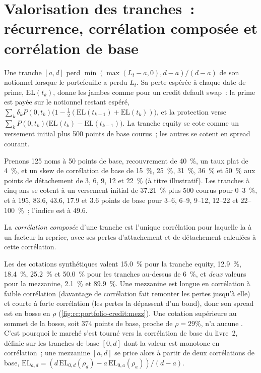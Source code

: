 \section{Valorisation des tranches~: récurrence, corrélation composée et corrélation de base}

Une tranche $[a,d]$ perd $\min(\max(L_t-a,0),d-a)/(d-a)$ de son notionnel lorsque le portefeuille
a perdu $L_t$. Sa perte espérée à chaque date de prime, $\mathrm{EL}(t_k)$, donne les jambes comme pour
un credit default swap~: la prime est payée sur le notionnel restant espéré,
$\sum_k\delta_kP(0,t_k)\bigl(1-\tfrac12(\mathrm{EL}(t_{k-1})+\mathrm{EL}(t_k))\bigr)$, et la protection
verse $\sum_kP(0,t_k)\bigl(\mathrm{EL}(t_k)-\mathrm{EL}(t_{k-1})\bigr)$. La tranche equity se cote comme un
versement initial plus 500 points de base courus~; les autres se cotent en spread courant.

\begin{example}\label{ex:rc:portfolio-credit:quotes}
Prenons 125 noms à 50 points de base, recouvrement de 40~\%, un taux plat de 4~\%, et un skew de
corrélation de base de 15~\%, 25~\%, 31~\%, 36~\% et 50~\% aux points de détachement de 3, 6, 9, 12 et 22~\% (à titre illustratif).
Les tranches à cinq ans se cotent à un versement initial de 37.21~\% plus 500 courus pour 0--3~\%, et
à 195, 83.6, 43.6, 17.9 et 3.6 points de base pour 3--6, 6--9, 9--12, 12--22 et 22--100~\%~;
l'indice est à 49.6.
\end{example}

\begin{definition}\label{def:rc:portfolio-credit:compound}
La \emph{corrélation composée} d'une tranche est l'unique
corrélation pour laquelle la  à un facteur la reprice, avec ses pertes
d'attachement et de détachement calculées à cette corrélation.
\end{definition}

Les  des cotations synthétiques valent 15.0~\% pour la tranche equity, 12.9~\%,
18.4~\%, 25.2~\% et 50.0~\% pour les tranches au-dessus de 6~\%, et \emph{deux} valeurs pour la
mezzanine, 2.1~\% et 89.9~\%. Une mezzanine est longue en corrélation à faible corrélation (davantage de corrélation fait remonter les pertes
jusqu'à elle) et courte à forte corrélation (les pertes la dépassent d'un bond), donc
son spread est en bosse en $\rho$ (\cref{fig:rc:portfolio-credit:mezz}). Une cotation supérieure au sommet de la bosse,
soit 374 points de base, proche de $\rho = 29\%$, n'a aucune . C'est pourquoi le marché
s'est tourné vers la corrélation de base du livre~2, définie sur les tranches de base
$[0,d]$ dont la valeur est monotone en corrélation~; une mezzanine $[a,d]$ se price alors à partir de deux
corrélations de base, $\mathrm{EL}_{a,d} = (d\,\mathrm{EL}_{0,d}(\rho_d)-a\,\mathrm{EL}_{0,a}(\rho_a))/(d-a)$.

